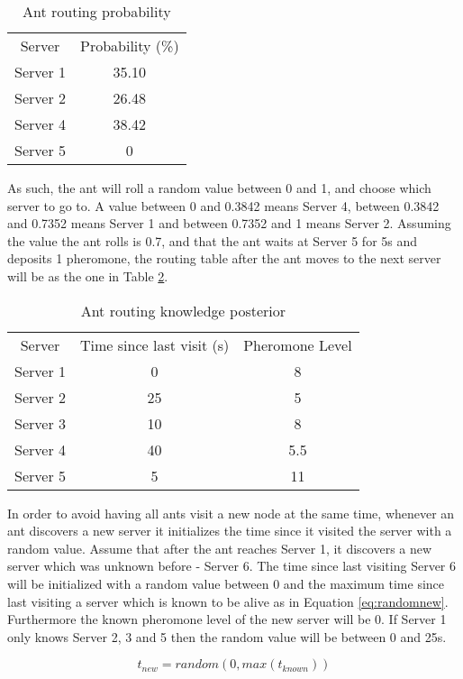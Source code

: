 \begin{table}
\centering
\begin{tabular}{c|c}
Server & Probability (\%) \\
Server 1 & 35.10 \\
Server 2 & 26.48 \\
Server 4 & 38.42 \\
Server 5 & 0 \\
\end{tabular}
\caption{Ant routing probability}
\label{tab:ant_prob}
\end{table}

As such, the ant will roll a random value between 0 and 1, and choose which server to go to. A value between 0 and 0.3842 means Server 4, between 0.3842 and 0.7352 means Server 1 and between 0.7352 and 1 means Server 2. Assuming the value the ant rolls is 0.7, and that the ant waits at Server 5 for 5s and deposits 1 pheromone, the routing table after the ant moves to the next server will be as the one in Table \ref{tab:ant_post}.

\begin{table}
\centering
\begin{tabular}{c|c|c}
Server & Time since last visit (s) & Pheromone Level \\
Server 1 & 0 & 8 \\
Server 2 & 25 & 5 \\
Server 3 & 10 & 8 \\
Server 4 & 40 & 5.5 \\
Server 5 & 5 & 11 \\
\end{tabular}
\caption{Ant routing knowledge posterior}
\label{tab:ant_post}
\end{table}

In order to avoid having all ants visit a new node at the same time, whenever an ant discovers a new server it initializes the time since it visited the server with a random value. Assume that after the ant reaches Server 1, it discovers a new server which was unknown before - Server 6. The time since last visiting Server 6 will be initialized with a random value between 0 and the maximum time since last visiting a server which is known to be alive as in Equation \ref{eq:randomnew}. Furthermore the known pheromone level of the new server will be 0. If Server 1 only knows Server 2, 3 and 5 then the random value will be between 0 and 25s.

\begin{equation}
t_{new} = random(0, max(t_{known}))
\label{eq:randomnew}
\end{equation}

